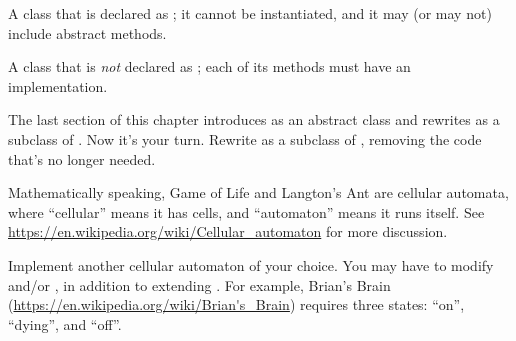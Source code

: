 \begin{description}

A class that is declared as ; it cannot be instantiated, and it may (or may not) include abstract methods.

A class that is \emph{not} declared as ; each of its methods must have an implementation.

\end{description}



\begin{exercise}

The last section of this chapter introduces  as an abstract class and rewrites  as a subclass of .
Now it's your turn.
Rewrite  as a subclass of , removing the code that's no longer needed.

\end{exercise}


\begin{exercise}

Mathematically speaking, Game of Life and Langton's Ant are cellular automata, where ``cellular'' means it has cells, and ``automaton'' means it runs itself.
See \url{https://en.wikipedia.org/wiki/Cellular_automaton} for more discussion.

Implement another cellular automaton of your choice.
You may have to modify  and/or , in addition to extending .
For example, Brian's Brain (\url{https://en.wikipedia.org/wiki/Brian's_Brain}) requires three states: ``on'', ``dying'', and ``off''.

\end{exercise}
